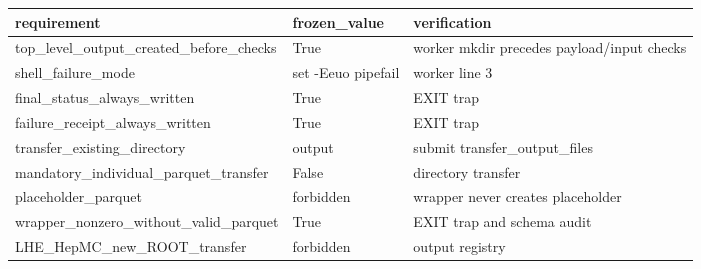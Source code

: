 \begin{tabular}{lll}
\toprule
requirement & frozen\_value & verification \\
\midrule
top\_level\_output\_created\_before\_checks & True & worker mkdir precedes payload/input checks \\
shell\_failure\_mode & set -Eeuo pipefail & worker line 3 \\
final\_status\_always\_written & True & EXIT trap \\
failure\_receipt\_always\_written & True & EXIT trap \\
transfer\_existing\_directory & output & submit transfer\_output\_files \\
mandatory\_individual\_parquet\_transfer & False & directory transfer \\
placeholder\_parquet & forbidden & wrapper never creates placeholder \\
wrapper\_nonzero\_without\_valid\_parquet & True & EXIT trap and schema audit \\
LHE\_HepMC\_new\_ROOT\_transfer & forbidden & output registry \\
\bottomrule
\end{tabular}
